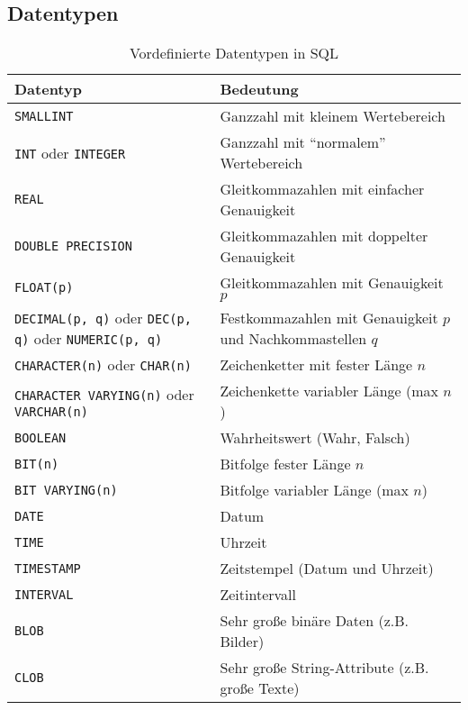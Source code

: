         \subsection{Datentypen} %
            \begin{table}[H]
            	\centering
            	\begin{tabular}{l | l}
            		Datentyp & Bedeutung \\ \hline
            		\lstinline|SMALLINT| & Ganzzahl mit kleinem Wertebereich \\
            		\lstinline|INT| oder \lstinline|INTEGER| & Ganzzahl mit \enquote{normalem} Wertebereich \\
            		\lstinline|REAL| & Gleitkommazahlen mit einfacher Genauigkeit \\
            		\lstinline|DOUBLE PRECISION| & Gleitkommazahlen mit doppelter Genauigkeit \\
            		\lstinline|FLOAT(p)| & Gleitkommazahlen mit Genauigkeit \(p\) \\
            		\lstinline|DECIMAL(p, q)| oder \lstinline|DEC(p, q)| oder \lstinline|NUMERIC(p, q)| & Festkommazahlen mit Genauigkeit \(p\) und Nachkommastellen \(q\) \\
            		\lstinline|CHARACTER(n)| oder \lstinline|CHAR(n)| & Zeichenketter mit fester Länge \(n\) \\
            		\lstinline|CHARACTER VARYING(n)| oder \lstinline|VARCHAR(n)| & Zeichenkette variabler Länge (max \(n\)) \\
            		\lstinline|BOOLEAN| & Wahrheitswert (Wahr, Falsch) \\
            		\lstinline|BIT(n)| & Bitfolge fester Länge \(n\) \\
            		\lstinline|BIT VARYING(n)| & Bitfolge variabler Länge (max \(n\)) \\
            		\lstinline|DATE| & Datum \\
            		\lstinline|TIME| & Uhrzeit \\
            		\lstinline|TIMESTAMP| & Zeitstempel (Datum und Uhrzeit) \\
            		\lstinline|INTERVAL| & Zeitintervall \\
            		\lstinline|BLOB| & Sehr große binäre Daten (z.B. Bilder) \\
            		\lstinline|CLOB| & Sehr große String-Attribute (z.B. große Texte)
            	\end{tabular}
            	\caption{Vordefinierte Datentypen in SQL}
            \end{table}

